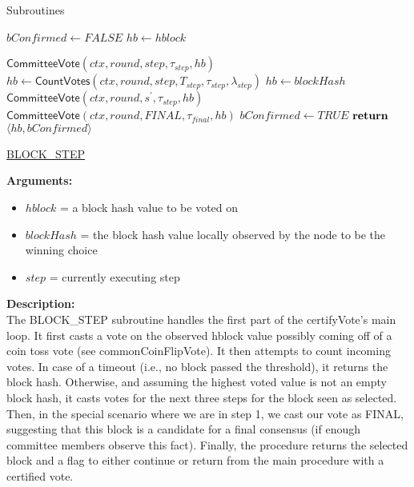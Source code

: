 \documentclass[10pt,a4paper]{article}
\begin{document}
\begin{section}{Subroutines}

\begin{algorithm}[H]
    \begin{algorithmic}[H]
        \State $bConfirmed \gets FALSE$
        \State $hb \gets hblock$

        \State $\mathsf{CommitteeVote}(ctx, round, step, \tau_{step}, hb)$
        \State $hb \gets \mathsf{CountVotes}(ctx,round,step,T_{step},\tau_{step},\lambda_{step})$
            \State $hb \gets blockHash$
                \State $\mathsf{CommitteeVote}(ctx, round, s^\prime, \tau_{step}, hb)$
            \EndFor
                \State $\mathsf{CommitteeVote}(ctx, round, FINAL, \tau_{final}, hb)$
            \EndIf
            \State $bConfirmed \gets TRUE$
        \EndIf
        $\Return$ $ \langle hb, bConfirmed \rangle$
    \EndFunction
    \end{algorithmic}
    \caption{\underline{BLOCK\_STEP}}
\end{algorithm}

\noindent \textbf{Arguments:}
\begin{itemize}
    \item $hblock$ = a block hash value to be voted on
    \item $blockHash$ = the block hash value locally observed by the node to be the winning choice
    \item $step$ = currently executing step
  \end{itemize}

\noindent \textbf{Description:}\\
The BLOCK\_STEP subroutine handles the first part of the certifyVote's main loop.
It first casts a vote on the observed hblock value possibly coming off of a coin toss vote 
(see commonCoinFlipVote).
It then attempts to count incoming votes. In case of a timeout (i.e., no block passed the 
threshold), it returns the block hash.
Otherwise, and assuming the highest voted value is not an empty block hash, it casts votes 
for the next three steps for the block seen as selected.
Then, in the special scenario where we are in step 1, we cast our vote as FINAL, suggesting 
that this block is a candidate for a final consensus (if enough committee members observe 
this fact).
Finally, the procedure returns the selected block and a flag to either continue or return 
from the main procedure with a certified vote.


\end{section}
\end{document}

